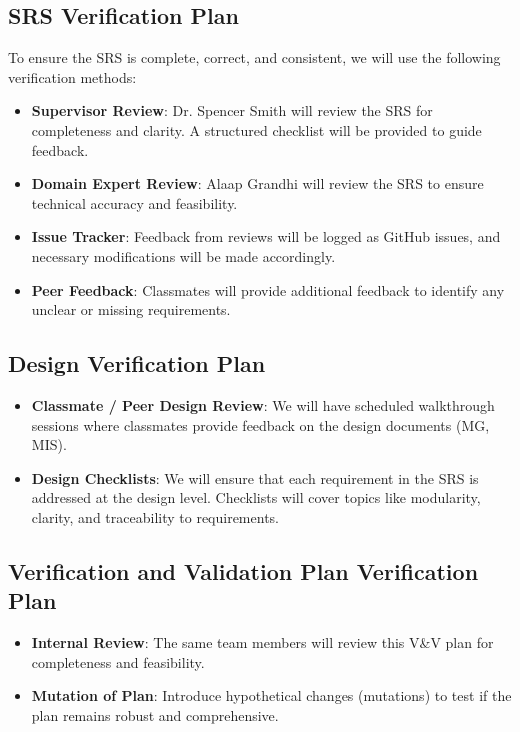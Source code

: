 \documentclass[12pt, titlepage]{article}
\begin{document}
\subsection{SRS Verification Plan}

To ensure the SRS is complete, correct, and consistent, we will use the following verification methods:

\begin{itemize}
    \item \textbf{Supervisor Review}: Dr. Spencer Smith will review the SRS for completeness and clarity. A structured checklist will be provided to guide feedback.
    \item \textbf{Domain Expert Review}: Alaap Grandhi will review the SRS to ensure technical accuracy and feasibility.
    \item \textbf{Issue Tracker}: Feedback from reviews will be logged as GitHub issues, and necessary modifications will be made accordingly.
    \item \textbf{Peer Feedback}: Classmates will provide additional feedback to identify any unclear or missing requirements.
\end{itemize}


\subsection{Design Verification Plan}
\begin{itemize}
  \item \textbf{Classmate / Peer Design Review}: We will have scheduled walkthrough sessions where classmates provide feedback on the design documents (MG, MIS).
  \item \textbf{Design Checklists}: We will ensure that each requirement in the SRS is addressed at the design level. Checklists will cover topics like modularity, clarity, and traceability to requirements.
\end{itemize}


\subsection{Verification and Validation Plan Verification Plan}

\begin{itemize}
  \item \textbf{Internal Review}: The same team members will review this V\&V plan for completeness and feasibility.
  \item \textbf{Mutation of Plan}: Introduce hypothetical changes (mutations) to test if the plan remains robust and comprehensive.
\end{itemize}
\end{document}
